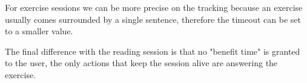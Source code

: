 For exercise sessions we can be more precise on the tracking because an exercise usually comes surrounded by a single sentence, therefore the timeout can be set to a smaller value. 

The final difference with the reading session is that no "benefit time" is granted to the user, the only actions that keep the session alive are answering the exercise.






